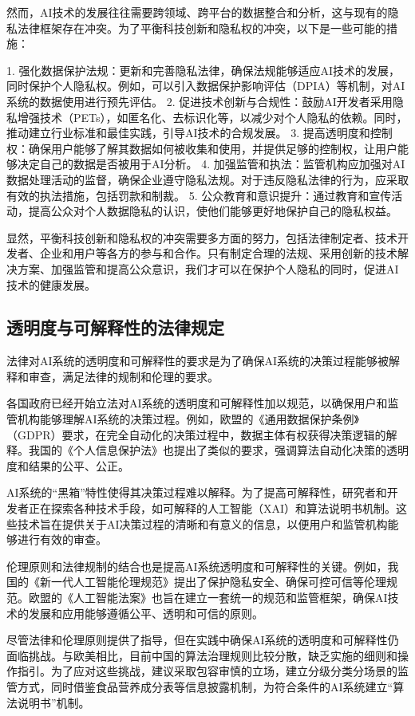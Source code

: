 然而，AI技术的发展往往需要跨领域、跨平台的数据整合和分析，这与现有的隐私法律框架存在冲突。为了平衡科技创新和隐私权的冲突，以下是一些可能的措施：

1. 强化数据保护法规：更新和完善隐私法律，确保法规能够适应AI技术的发展，同时保护个人隐私权。例如，可以引入数据保护影响评估（DPIA）等机制，对AI系统的数据使用进行预先评估。
2. 促进技术创新与合规性：鼓励AI开发者采用隐私增强技术（PETs），如匿名化、去标识化等，以减少对个人隐私的依赖。同时，推动建立行业标准和最佳实践，引导AI技术的合规发展。
3. 提高透明度和控制权：确保用户能够了解其数据如何被收集和使用，并提供足够的控制权，让用户能够决定自己的数据是否被用于AI分析。
4. 加强监管和执法：监管机构应加强对AI数据处理活动的监督，确保企业遵守隐私法规。对于违反隐私法律的行为，应采取有效的执法措施，包括罚款和制裁。
5. 公众教育和意识提升：通过教育和宣传活动，提高公众对个人数据隐私的认识，使他们能够更好地保护自己的隐私权益。

显然，平衡科技创新和隐私权的冲突需要多方面的努力，包括法律制定者、技术开发者、企业和用户等各方的参与和合作。只有制定合理的法规、采用创新的技术解决方案、加强监管和提高公众意识，我们才可以在保护个人隐私的同时，促进AI技术的健康发展。

\subsection{透明度与可解释性的法律规定}

法律对AI系统的透明度和可解释性的要求是为了确保AI系统的决策过程能够被解释和审查，满足法律的规制和伦理的要求。

各国政府已经开始立法对AI系统的透明度和可解释性加以规范，以确保用户和监管机构能够理解AI系统的决策过程。例如，欧盟的《通用数据保护条例》（GDPR）要求，在完全自动化的决策过程中，数据主体有权获得决策逻辑的解释。我国的《个人信息保护法》也提出了类似的要求，强调算法自动化决策的透明度和结果的公平、公正。

AI系统的“黑箱”特性使得其决策过程难以解释。为了提高可解释性，研究者和开发者正在探索各种技术手段，如可解释的人工智能（XAI）和算法说明书机制。这些技术旨在提供关于AI决策过程的清晰和有意义的信息，以便用户和监管机构能够进行有效的审查。

伦理原则和法律规制的结合也是提高AI系统透明度和可解释性的关键。例如，我国的《新一代人工智能伦理规范》提出了保护隐私安全、确保可控可信等伦理规范。欧盟的《人工智能法案》也旨在建立一套统一的规范和监管框架，确保AI技术的发展和应用能够遵循公平、透明和可信的原则。

尽管法律和伦理原则提供了指导，但在实践中确保AI系统的透明度和可解释性仍面临挑战。与欧美相比，目前中国的算法治理规则比较分散，缺乏实施的细则和操作指引。为了应对这些挑战，建议采取包容审慎的立场，建立分级分类分场景的监管方式，同时借鉴食品营养成分表等信息披露机制，为符合条件的AI系统建立“算法说明书”机制。


